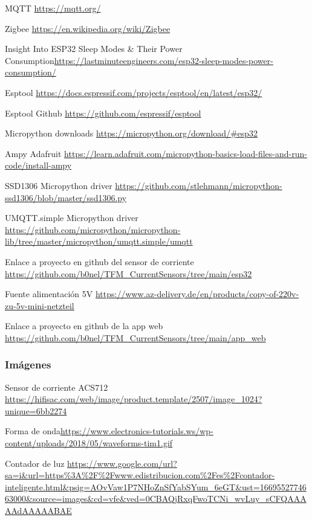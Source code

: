 \begin{thebibliography}{9}
MQTT \url{https://mqtt.org/}

Zigbee \url{https://en.wikipedia.org/wiki/Zigbee}

Insight Into ESP32 Sleep Modes \& Their Power Consumption\url{https://lastminuteengineers.com/esp32-sleep-modes-power-consumption/}

Esptool \url{https://docs.espressif.com/projects/esptool/en/latest/esp32/}

Esptool Github \url{https://github.com/espressif/esptool}

Micropython downloads \url{https://micropython.org/download/#esp32}

Ampy Adafruit \url{https://learn.adafruit.com/micropython-basics-load-files-and-run-code/install-ampy}

SSD1306 Micropython driver \url{https://github.com/stlehmann/micropython-ssd1306/blob/master/ssd1306.py}

UMQTT.simple Micropython driver \url{https://github.com/micropython/micropython-lib/tree/master/micropython/umqtt.simple/umqtt}

Enlace a proyecto en github del sensor de corriente \url{https://github.com/b0nel/TFM_CurrentSensors/tree/main/esp32}

Fuente alimentación 5V \url{https://www.az-delivery.de/en/products/copy-of-220v-zu-5v-mini-netzteil}

Enlace a proyecto en github de la app web \url{https://github.com/b0nel/TFM_CurrentSensors/tree/main/app_web}















\subsubsection{Imágenes}
Sensor de corriente ACS712 \url{https://hifisac.com/web/image/product.template/2507/image_1024?unique=6bb2274}

Forma de onda\url{https://www.electronics-tutorials.ws/wp-content/uploads/2018/05/waveforms-tim1.gif}

Contador de luz \url{https://www.google.com/url?sa=i&url=https%3A%2F%2Fwww.edistribucion.com%2Fes%2Fcontador-inteligente.html&psig=AOvVaw1P7NHoZnSfYabSYum_6eGT&ust=1669552774663000&source=images&cd=vfe&ved=0CBAQjRxqFwoTCNi_wvLuy_sCFQAAAAAdAAAAABAE}


\end{thebibliography}

